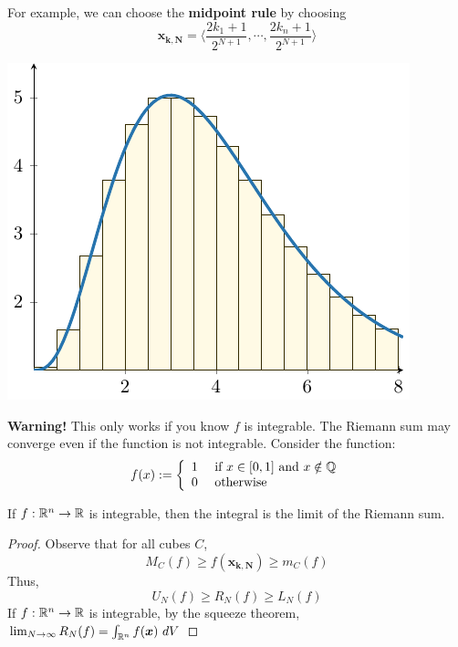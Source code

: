     \begin{example}
        For example, we can choose the \textbf{midpoint rule} by choosing $$\bm{x_{k,N}} = \langle \frac{2k_1 + 1}{2^{N+1}}, \cdots, \frac{2k_n + 1}{2^{N+1}} \rangle $$

        \begin{center}
            \includegraphics{chapters/4-IntegrationRn/figures/figures-riemannmidpoint.pdf}
        \end{center}
    \end{example}


    
    \begin{example}
     \textbf{Warning!} This only works if you know $f$ is integrable.  The Riemann sum may converge even if the function is not integrable.  Consider the function: $$f(x) := \left\{
		\begin{array}{ll}
			1 & \text{ if } x \in [0,1] \text{ and }  x \notin \mathbb{Q} \\
			0 & \text{ otherwise}
		\end{array}
		\right.$$   
    \end{example}

\begin{proposition}\label{prop:riemannisintegrable}
    If $f: \mathbb{R}^n \to \mathbb{R}$ is integrable, then the integral is the limit of the Riemann sum.  
    \end{proposition}

    \begin{proof}
        Observe that for all cubes $C$, $$M_C(f) \geq f(\bm{x_{k,N}}) \geq m_C(f)$$
        Thus, $$U_N(f) \geq R_N(f) \geq L_N(f)$$
        If $f: \mathbb{R}^n \to \mathbb{R}$ is integrable, by the squeeze theorem, $\lim_{N \to \infty} R_N(f) = \int_{\mathbb{R}^n} f(\bm{x}) \ dV$
    \end{proof}

